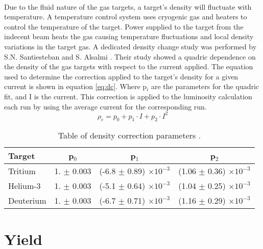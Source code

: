 \paragraph{}  Due to the fluid nature of the gas targets, a target's density will fluctuate with temperature. A temperature control system uses cryogenic gas and heaters to control the temperature of the target. Power supplied to the target from the indecent beam heats the gas causing temperature fluctuations and local density variations in the target gas. A dedicated density change study was performed by S.N. Santiesteban and S. Alsalmi \cite{denscor}. Their study showed a quadric dependence on the density of the gas targets with respect to the current applied. The equation used to determine the correction applied to the target's density for a given current is shown in equation \ref{eq:dc}. Where p$_i$ are the parameters for the quadric fit, and I is the current. This correction is applied to the luminosity calculation each run by using the average current for the corresponding run. 
\begin{equation}
\rho_c = p_0 + p_1 \cdot I + p_2 \cdot I^2 \label{eq:dc}
\end{equation}
\begin{table}[]
	\caption{Table of density correction parameters \cite{denscor}.}
	\centering
	\begin{tabular}{lccc}
		Target & p$_0$ & p$_1$ & p$_2$  \\
		\hline
		Tritium & 1. $\pm$ 0.003 & (-6.8 $\pm$ 0.89) $\times 10^{-3}$ & (1.06 $\pm$ 0.36) $\times 10^{-3}$\\
		Helium-3 & 1. $\pm$ 0.003 & (-5.1 $\pm$ 0.64) $\times 10^{-3}$ & (1.04 $\pm$ 0.25) $\times 10^{-3}$\\
		Deuterium & 1. $\pm$ 0.003 & (-6.7 $\pm$ 0.71) $\times 10^{-3}$ & (1.16 $\pm$ 0.29) $\times 10^{-3}$\\
		\hline
	\end{tabular}
\end{table}

\section{Yield}
